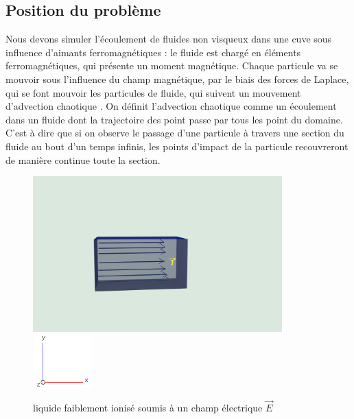 \documentclass[a4paper,12pt,titlepage]{report}
\begin{document}
\begin{onehalfspace}
\chapter{Position du problème}

Nous devons simuler l'écoulement de fluides non visqueux dans une cuve sous influence d'aimants ferromagnétiques : le fluide est chargé en éléments ferromagnétiques, qui présente un moment magnétique. Chaque particule va se mouvoir sous l'influence du champ magnétique, par le biais des forces de Laplace, qui se font mouvoir les particules de fluide, qui suivent un mouvement d'advection chaotique . On définit l'advection chaotique comme un écoulement dans un fluide dont la trajectoire des point passe par tous les point du domaine.
C'est à dire que si on observe le passage d'une particule à travers une section du fluide au bout d'un temps infinis, les points d'impact de la particule recouvreront de manière continue toute la section.
\begin{figure}
	\begin{center}
	\centering	
		\includegraphics[height = 6cm, keepaspectratio]{graphes/blender_cuve_champvec.png}
		\includegraphics[height = 2cm, keepaspectratio]{graphes/axes.png}
		\caption{liquide faiblement ionisé soumis à un champ électrique $\vec{E}$}

\end{center}
\end{figure}
\end{onehalfspace}
\end{document}
